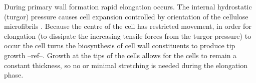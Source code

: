 During primary wall formation rapid elongation occurs. The internal hydrostatic (turgor) pressure causes cell expansion controlled by orientation of the cellulose microfibrils \cite{Tyerman_2002} \cite{16261190}.
Because the centre of the cell has restricted movement, in order for elongation
(to dissipate the increasing tensile forces from the turgor pressure)
to occur the cell turns the biosynthesis of cell wall constituents to produce
tip growth --ref--. Growth at the tips of the cells allows for the cells to
remain a constant thickness, so no or minimal stretching is needed during the elongation
phase.